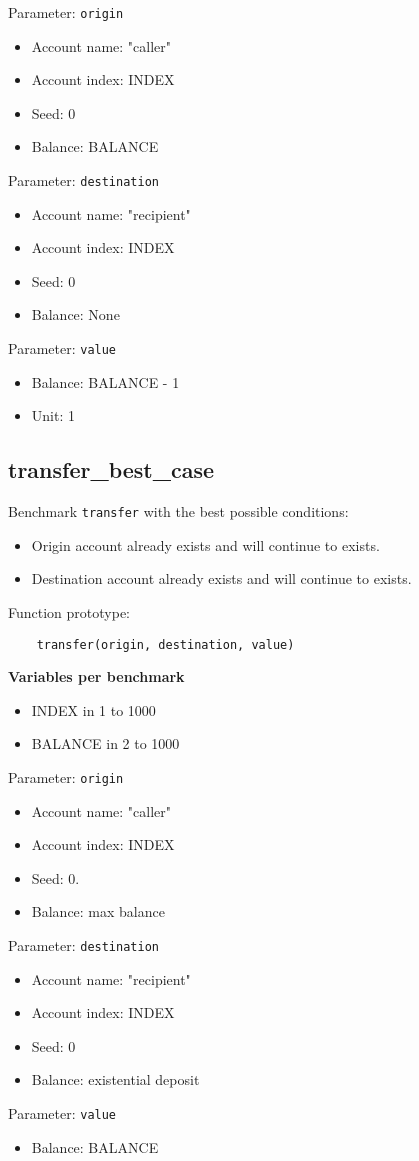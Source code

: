 \documentclass[11pt,a4paper]{article}
\begin{document}
Parameter: \verb|origin|
\begin{itemize}
\item Account name: "caller"
\item Account index: INDEX
\item Seed: 0
\item Balance: BALANCE
\end{itemize}

Parameter: \verb|destination|
\begin{itemize}
\item Account name: "recipient"
\item Account index: INDEX
\item Seed: 0
\item Balance: None
\end{itemize}

Parameter: \verb|value|
\begin{itemize}
\item Balance: BALANCE - 1
\item Unit: 1
\end{itemize}

\subsection{transfer\_best\_case}

Benchmark \verb|transfer| with the best possible conditions:
\begin{itemize}
\item Origin account already exists and will continue to exists.
\item Destination account already exists and will continue to exists.
\end{itemize}

Function prototype:

\begin{verbatim}
    transfer(origin, destination, value)
\end{verbatim}

\textbf{Variables per benchmark}
\begin{itemize}
\item INDEX in 1 to 1000
\item BALANCE in 2 to 1000
\end{itemize}

Parameter: \verb|origin|
\begin{itemize}
\item Account name: "caller"
\item Account index: INDEX
\item Seed: 0.
\item Balance: max balance
\end{itemize}

Parameter: \verb|destination|
\begin{itemize}
\item Account name: "recipient"
\item Account index: INDEX
\item Seed: 0
\item Balance: existential deposit
\end{itemize}

Parameter: \verb|value|
\begin{itemize}
\item Balance: BALANCE
\end{itemize}
\end{document}
